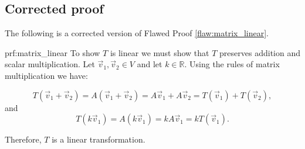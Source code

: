 \clearpage
\subsection{Corrected proof}

The following is a corrected version of Flawed Proof \ref{flaw:matrix_linear}. %

\begin{prf}{prf:matrix_linear} %
To show $T$ is linear we must show that $T$ preserves addition and scalar multiplication.  Let $\vec{v}_1, \vec{v}_2 \in V$ and let $k \in \mathbb{R}$. Using the rules of matrix multiplication we have:

$$T(\vec{v}_1 + \vec{v}_2) = A(\vec{v}_1 + \vec{v}_2) = A\vec{v}_1 + A\vec{v}_2 = T(\vec{v}_1) + T(\vec{v}_2), $$ and
$$T(k\vec{v}_1) = A(k\vec{v}_1) = kA\vec{v}_1= kT(\vec{v}_1). $$

Therefore, $T$ is a linear transformation.
\end{prf} 